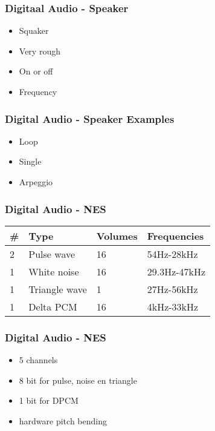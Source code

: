 \documentclass[aspectratio=43]{uva-inf-presentation}
\begin{document}

\begin{frame}
\frametitle{Digitaal Audio - Speaker}

\begin{itemize}
\item Squaker
\item Very rough
\item On or off
\item Frequency
\end{itemize}

\end{frame}


\begin{frame}
\frametitle{Digital Audio - Speaker Examples}

\begin{itemize}
\item Loop
\item Single
\item Arpeggio
\end{itemize}

\end{frame}


\begin{frame}
\frametitle{Digital Audio - NES}

\begin{tabular}{|l|l|l|l|}
\hline \# & Type & Volumes & Frequencies \\ \hline
2 & Pulse wave & 16 & 54Hz-28kHz \\
1 & White noise & 16 & 29.3Hz-47kHz \\
1 & Triangle wave & 1 & 27Hz-56kHz \\
1 & Delta PCM & 16 & 4kHz-33kHz \\ \hline
\end{tabular}

\end{frame}


\begin{frame}
\frametitle{Digital Audio - NES}

\begin{itemize}
\item 5 channels
\item 8 bit for pulse, noise en triangle
\item 1 bit for DPCM
\item hardware pitch bending
\end{itemize}

\end{frame}
\end{document}
